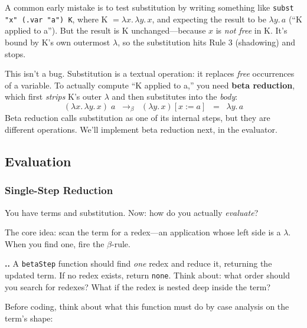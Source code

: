 \documentclass[11pt,a4paper]{article}
\newcounter{exercise}[section]
\renewcommand{\theexercise}{\thesection.\arabic{exercise}}
\theoremstyle{definition}
\newcommand{\lam}{\lambda}
\newcommand{\reduce}{\longrightarrow_\beta}
\begin{document}
\begin{intuition}
A common early mistake is to test substitution by writing something like
\texttt{subst "x" (.var "a") K}, where K $= \lam x.\, \lam y.\, x$, and
expecting the result to be $\lam y.\, a$ (``K applied to a''). But the
result is K unchanged---because $x$ is \emph{not free} in K. It's bound by K's
own outermost $\lam$, so the substitution hits Rule 3 (shadowing) and stops.

This isn't a bug. Substitution is a textual operation: it replaces \emph{free}
occurrences of a variable. To actually compute ``K applied to a,'' you need
\textbf{beta reduction}, which first \emph{strips} K's outer $\lam$ and then
substitutes into the \emph{body}:
\[
  (\lam x.\, \lam y.\, x)\;a
  \;\;\reduce\;\;
  (\lam y.\, x)[x := a]
  \;\;=\;\;
  \lam y.\, a
\]
Beta reduction calls substitution as one of its internal steps, but they are
different operations. We'll implement beta reduction next, in the evaluator.
\end{intuition}

\subsection{Evaluation}\label{sec:evalimpl}

\subsubsection{Single-Step Reduction}

You have terms and substitution. Now: how do you actually \emph{evaluate}?

The core idea: scan the term for a redex---an application whose left side is a
$\lam$. When you find one, fire the $\beta$-rule.

\begin{exercisebox}
\textbf{\theexercise.}\; A \texttt{betaStep} function should find \emph{one} redex and reduce it, returning the updated term. If no redex exists, return \texttt{none}. Think about: what order should you search for redexes? What if the redex is nested deep inside the term?
\end{exercisebox}

Before coding, think about what this function must do by case analysis on the
term's shape:
\end{document}
